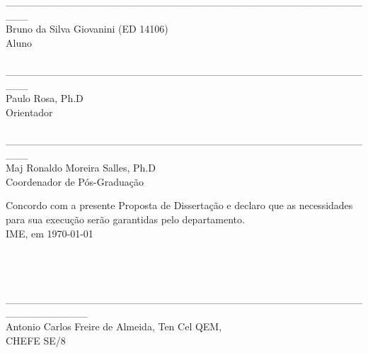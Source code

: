 \documentclass[a4paper, 12pt]{article}
\begin{document}
\newpage


 

\newpage

\begin{center}
\_\_\_\_\_\_\_\_\_\_\_\_\_\_\_\_\_\_\_\_\_\_\_\_\_\_\_\_\_\_\_\_\_\_\_\_\_\_\_\_\_\_\_\_\_\_\_\_\_\_\_ \\

Bruno da Silva Giovanini (ED 14106) \\Aluno \\ 
 
\hspace{4cm}
\\


\_\_\_\_\_\_\_\_\_\_\_\_\_\_\_\_\_\_\_\_\_\_\_\_\_\_\_\_\_\_\_\_\_\_\_\_\_\_\_\_\_\_\_\_\_\_\_\_\_\_\_ \\
Paulo Rosa, Ph.D \\Orientador \\ 

\hspace{4cm}
\\


\_\_\_\_\_\_\_\_\_\_\_\_\_\_\_\_\_\_\_\_\_\_\_\_\_\_\_\_\_\_\_\_\_\_\_\_\_\_\_\_\_\_\_\_\_\_\_\_\_\_\_ \\
Maj Ronaldo Moreira Salles, Ph.D \\Coordenador de Pós-Graduação \\

\hspace{4cm}

\end{center}
Concordo com a presente Proposta de Dissertação e declaro que as necessidades para sua execução serão garantidas pelo departamento. \\
IME, em \today
 \hspace{4cm}
 \\
 \\
 \\
 \\
 
\begin{center}
\_\_\_\_\_\_\_\_\_\_\_\_\_\_\_\_\_\_\_\_\_\_\_\_\_\_\_\_\_\_\_\_\_\_\_\_\_\_\_\_\_\_\_\_\_\_\_\_\_\_\_\_\_\_\_\_\_\_\_ \\
Antonio Carlos Freire de Almeida, Ten Cel QEM, \\
CHEFE SE/8
\end{center}
\end{document}
